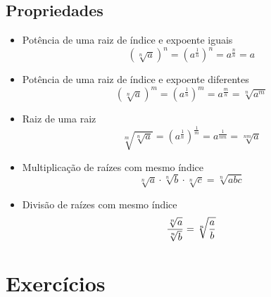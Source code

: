 	\subsection{Propriedades}
	\begin{itemize}
		\item Potência de uma raiz de índice e expoente iguais
		\begin{equation}
			(\sqrt[n]{a}) ^ {n} = \left(a^{\frac{1}{n}}\right)^n = a^{\frac{n}{n}} = a
			\nonumber    
		\end{equation}
		\item Potência de uma raiz de índice e expoente diferentes
		\begin{equation}
			\left(\sqrt[n]{a}\right)^m = \left(a^{\frac{1}{n}}\right)^m = a^{\frac{m}{n}} = \sqrt[n]{a^m}
			\nonumber    
		\end{equation}
		\item Raiz de uma raiz
		\begin{equation}
			\sqrt[m]{\sqrt[n]{a}} = \left(a^{\frac{1}{n}}\right)^{\frac{1}{m}} = a^{\frac{1}{nm}} = \sqrt[nm]{a}
			\nonumber    
		\end{equation}
		\item Multiplicação de raízes com mesmo índice
		\begin{equation}
			\sqrt[n]{a} \cdot \sqrt[n]{b} \cdot \sqrt[n]{c} = \sqrt[n]{abc}
			\nonumber    
		\end{equation}
		\item Divisão de raízes com mesmo índice
		\begin{equation}
			\dfrac{\sqrt[n]{a}}{\sqrt[n]{b}} = \sqrt[n]{\displaystyle\frac{a}{b}}
			\nonumber    
		\end{equation}
	\end{itemize}
	
	\section{Exercícios}
 
